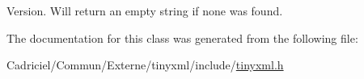 Version. Will return an empty string if none was found. 



The documentation for this class was generated from the following file\-:\begin{DoxyCompactItemize}
\item 
Cadriciel/\-Commun/\-Externe/tinyxml/include/\hyperlink{tinyxml_8h}{tinyxml.\-h}\end{DoxyCompactItemize}
